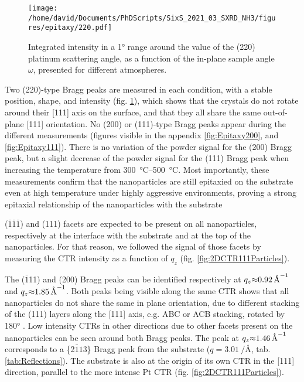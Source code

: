 \begin{figure}[!htb]
    \centering
    \texttt{[image: /home/david/Documents/PhDScripts/SixS\_2021\_03\_SXRD\_NH3/figures/epitaxy/220.pdf]}
    \caption{
        Integrated intensity in a \ang{1} range around the value of the (220) platinum scattering angle, as a function of the in-plane sample angle $\omega$, presented for different atmospheres.
    }
    \label{fig:Epitaxy220}
\end{figure}

Two (220)-type Bragg peaks are measured in each condition, with a stable position, shape, and intensity (fig. \ref{fig:Epitaxy220}), which shows that the crystals do not rotate around their [111] axis on the surface, and that they all share the same out-of-plane [111] orientation.
No (200) or (111)-type Bragg peaks appear during the different measurements (figures visible in the appendix \ref{fig:Epitaxy200}, and \ref{fig:Epitaxy111}).
There is no variation of the powder signal for the (200) Bragg peak, but a slight decrease of the powder signal for the (111) Bragg peak when increasing the temperature from \qtyrange{300}{500}{\degreeCelsius}.
Most importantly, these measurements confirm that the nanoparticles are still epitaxied on the substrate even at high temperature under highly aggressive environments, proving a strong epitaxial relationship of the nanoparticles with the substrate

($\bar{1}\bar{1}\bar{1}$) and (111) facets are expected to be present on all nanoparticles, respectively at the interface with the substrate and at the top of the nanoparticles.
For that reason, we followed the signal of those facets by measuring the CTR intensity as a function of $q_z$ (fig. \ref{fig:2DCTR111Particles}).

The ($\bar{1}$11) and (200) Bragg peaks can be identified respectively at $q_z \qty{\approx0.92}{\per\angstrom}$ and $q_z \qty{\approx1.85}{\per\angstrom}$.
Both peaks being visible along the same CTR shows that all nanoparticles do not share the same in plane orientation, due to different stacking of the (111) layers along the [111] axis, e.g. ABC or ACB stacking, rotated by \ang{180} \parencite{Jones2019}.
Low intensity CTRs in other directions due to other facets present on the nanoparticles can be seen around both Bragg peaks.
The peak at $q_z \qty{\approx1.46}{\per\angstrom}$ corresponds to a \{2$\bar{1}1$3\} Bragg peak from the  substrate ($q = \qty{3.01}{\per\angstrom}$, tab. \ref{tab:Reflections}).
The substrate is also at the origin of its own CTR in the [111] direction, parallel to the more intense Pt CTR (fig. \ref{fig:2DCTR111Particles}).

